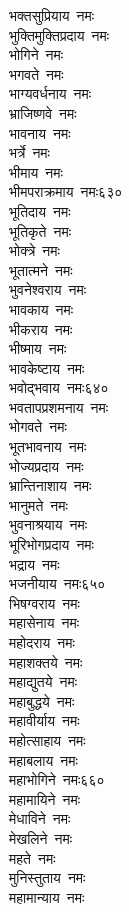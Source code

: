 \begin{multicols}{\maxColumns}
\begin{flushleft}
भक्तसुप्रियाय~नमः\\
भुक्तिमुक्तिप्रदाय~नमः\\
भोगिने~नमः\\
भगवते~नमः\\
भाग्यवर्धनाय~नमः\\
भ्राजिष्णवे~नमः\\
भावनाय~नमः\\
भर्त्रे~नमः\\
भीमाय~नमः\\
भीमपराक्रमाय~नमः\hfill ६३०\\
भूतिदाय~नमः\\
भूतिकृते~नमः\\
भोक्त्रे~नमः\\
भूतात्मने~नमः\\
भुवनेश्वराय~नमः\\
भावकाय~नमः\\
भीकराय~नमः\\
भीष्माय~नमः\\
भावकेष्टाय~नमः\\
भवोद्भवाय~नमः\hfill ६४०\\
भवतापप्रशमनाय~नमः\\
भोगवते~नमः\\
भूतभावनाय~नमः\\
भोज्यप्रदाय~नमः\\
भ्रान्तिनाशाय~नमः\\
भानुमते~नमः\\
भुवनाश्रयाय~नमः\\
भूरिभोगप्रदाय~नमः\\
भद्राय~नमः\\
भजनीयाय~नमः\hfill ६५०\\
भिषग्वराय~नमः\\
महासेनाय~नमः\\
महोदराय~नमः\\
महाशक्तये~नमः\\
महाद्युतये~नमः\\
महाबुद्धये~नमः\\
महावीर्याय~नमः\\
महोत्साहाय~नमः\\
महाबलाय~नमः\\
महाभोगिने~नमः\hfill ६६०\\
महामायिने~नमः\\
मेधाविने~नमः\\
मेखलिने~नमः\\
महते~नमः\\
मुनिस्तुताय~नमः\\
महामान्याय~नमः\\

\end{flushleft}
\end{multicols}
